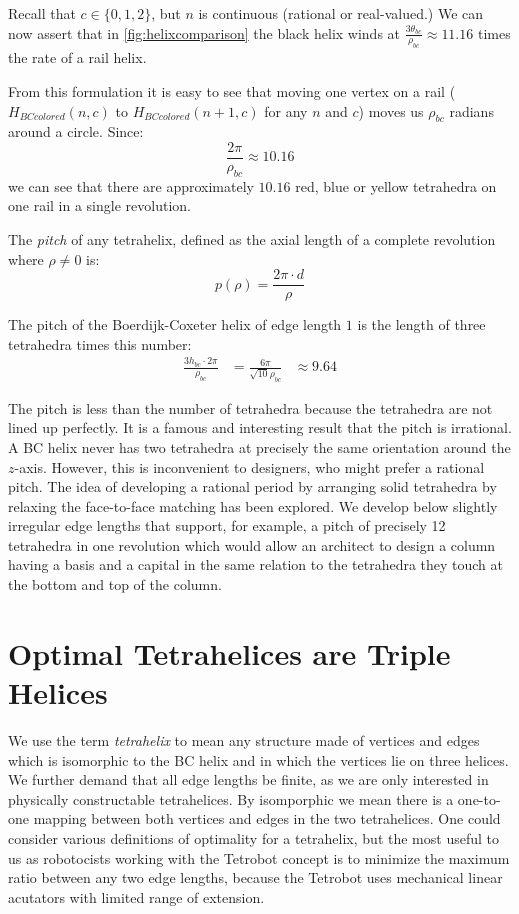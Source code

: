 \documentclass[review]{siamonline1116}
\begin{document}
Recall that $c \in \{0,1,2\}$, but $n$ is continuous (rational or real-valued.)
We can now assert that in \cref{fig:helixcomparison} the black helix winds at
$\frac{3 \theta_{bc}}{\rho_{bc}} \approx 11.16 $ times the rate of a rail helix.

From this formulation it is easy to see that moving one vertex on a rail
($H_{BCcolored}(n,c)$ to $H_{BCcolored}(n+1,c)$ for any $n$ and $c$)
moves us $\rho_{bc}$ radians around a circle. Since:
\[ \frac{2 \pi}{\rho_{bc}} \approx 10.16
\]
we can see that there are approximately $10.16$ red, blue or yellow tetrahedra on one rail in a single revolution.

The \emph{pitch} of any tetrahelix, defined as the axial length of a complete revolution
where $\rho \neq 0$ is:
\begin{equation}
  \label{pitcheqn}
p(\rho) = \frac{2 \pi  \cdot d}{\rho}
\end{equation}

The pitch of the Boerdijk-Coxeter helix of edge length $1$ is the length of three tetrahedra times this number:
\begin{align*}
   \frac{3 h_{bc}\cdot  2 \pi }{\rho_{bc}} 
  &= \frac{6 \pi}{\sqrt{10}\rho_{bc}} 
  &\approx 9.64 
\end{align*}


The pitch is less than the number of tetrahedra because the tetrahedra
are not lined up perfectly.  It is a famous and interesting result
that the pitch is irrational. A BC helix never has two tetrahedra at
precisely the same orientation around the $z$-axis. However, this is
inconvenient to designers, who might prefer a rational pitch.
The idea of developing a rational period by arranging solid tetrahedra by relaxing the face-to-face matching
has been explored\cite{sadler2013periodic}. 
We develop below slightly irregular edge lengths that support, for example, a pitch of precisely 12
tetrahedra in one revolution which would allow an architect to design a
column having a basis and a capital in the same relation to the
tetrahedra they touch at the bottom and top of the column.


\section{Optimal Tetrahelices are Triple Helices}

We use the term \emph{tetrahelix} to mean any structure made of
vertices and edges which is isomorphic to the BC helix and in which the
vertices lie on three helices. We further demand that all edge lengths
be finite, as we are only interested in physically constructable tetrahelices.
By isomporphic we mean there is a one-to-one mapping between both
vertices and edges in the two tetrahelices.
One could consider various definitions of optimality for a
tetrahelix, but the most useful to us as robotocists working with the Tetrobot
concept is to minimize the
maximum ratio between any two edge lengths, because the Tetrobot uses
mechanical linear acutators with
limited range of extension.
\end{document}

